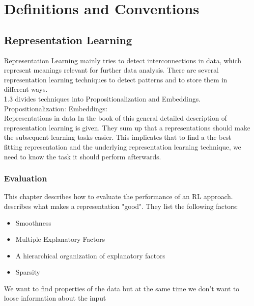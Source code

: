 \chapter{Definitions and Conventions}\label{theory}
\section{Representation Learning}
Representation Learning mainly tries to detect interconnections in data, which represent meanings relevant for further data analysis. There are several representation learning techniques to detect patterns and to store them in different ways.\\
\cite{lavrac_representation_2021} 1.3
divides techniques into Propositionalization and Embeddings.\\
Propositionalization:
Embeddings:\\
Representations in data
In the book of  this general detailed description of representation learning is given. They sum up that a representations should make the subsequent learning tasks easier. This implicates that to find a the best fitting representation and the underlying representation learning technique, we need to know the task it should perform afterwards.
\subsection{Evaluation}
This chapter describes how to evaluate the performance of an RL approach.\\
\cite{bengio_representation_2013} describes what makes a representation "good". They list the following factors:\\
\begin{itemize}
  \item Smoothness
  \item Multiple Explanatory Factors
  \item A hierarchical organization of explanatory factors
  \item Sparsity
\end{itemize}
We want to find properties of the data but at the same time we don't want to loose information about the input \cite[S. 525]{goodfellow_deep_2016}\\

